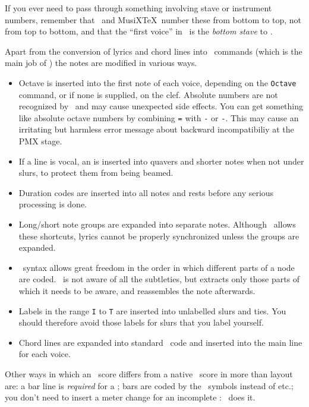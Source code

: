 \documentclass[11pt]{article}
\begin{document}
If you ever need to pass through something involving stave or instrument 
numbers, remember that \PMX\ and MusiX\TeX\ number these from bottom to
top, not from top to bottom, and that the ``first voice'' in \PMX\ is the 
\emph{bottom stave} to \MTx.  

Apart from the conversion of lyrics and chord lines into \PMX\ commands 
(which is the main job of \MTx) the notes are modified in various ways.
\begin{itemize}
  \item Octave is inserted into the first note of each voice, depending 
on the  \texttt{Octave} command, or if none is supplied, 
on the clef.  
Absolute  numbers are not recognized by \MTx\ and
may cause unexpected side effects.  You can get something like absolute 
octave numbers by combining \verb"=" with \verb"-" or \verb"-".  This
may cause an irritating but harmless error message about backward 
incompatibiliy at the PMX stage. 
  \item If a line is vocal, an  is inserted into quavers and 
shorter notes when not under slurs, to protect them from being beamed. 
  \item Duration codes are inserted into all notes and rests before any 
serious processing is done.   
  \item  Long/short note groups are expanded into separate notes.
Although \PMX\ allows these shortcuts, lyrics
cannot be properly synchronized unless the groups are expanded. 
  \item  \PMX\ syntax allows great freedom in the order in which
different parts of a node are coded.  \MTx\ is not aware of
all the subtleties, but extracts only those parts of which it needs to
be aware, and reassembles the note afterwards.
    \item Labels in the range
    \texttt{I} to \texttt{T} are inserted into unlabelled slurs and ties.    
    You should therefore avoid those labels for slurs that you label yourself.
  \item  Chord lines are expanded into standard \PMX\ code and inserted
into the main line for each voice.
  \end{itemize} 

Other ways in which an \MTx\ score differs from a native \PMX\ score in 
more than layout are: a bar line is \emph{required} for a ; 
 bars 
are coded by the \ABC\ symbols instead of  etc.; you don't 
need to insert a meter change for an incomplete : 
\MTx\ does it.
\end{document}
